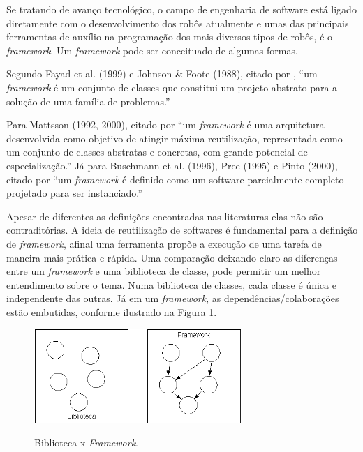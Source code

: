 Se tratando de avanço tecnológico, o campo de engenharia de software está ligado diretamente com o desenvolvimento dos robôs atualmente e umas das principais ferramentas de auxílio na programação dos mais diversos tipos de robôs, é o \textit{framework}. Um \textit{framework} pode ser conceituado de algumas formas.

Segundo Fayad et al. (1999) e Johnson \& Foote (1988), citado por , “um \textit{framework }é um conjunto de classes que constitui um projeto abstrato para a solução de uma família de problemas.”

Para Mattsson (1992, 2000), citado por  “um \textit{framework} é uma arquitetura desenvolvida como objetivo de atingir máxima reutilização, representada como um conjunto de classes abstratas e concretas, com grande potencial de especialização.”
Já para Buschmann et al. (1996), Pree (1995) e Pinto (2000), citado por  “um \textit{framework }é definido como um software parcialmente completo projetado para ser instanciado.”

Apesar de diferentes as definições encontradas nas literaturas elas não são contraditórias. A ideia de reutilização de softwares é fundamental para a definição de \textit{framework}, afinal uma ferramenta propõe a execução de uma tarefa de maneira mais prática e rápida. Uma comparação deixando claro as diferenças entre um \textit{framework }e uma biblioteca de classe, pode permitir um melhor entendimento sobre o tema. Numa biblioteca de classes, cada classe é única e independente das outras. Já em um \textit{framework}, as dependências/colaborações estão embutidas, conforme ilustrado na Figura \ref{fig:biblioteca_vs_framework}.

\begin{figure}[H]
	\centering
	\caption{Biblioteca x \textit{Framework}.}
	\includegraphics[width=0.7\textwidth]
	{Figures/biblioteca_vs_framework}
	\label{fig:biblioteca_vs_framework}
\end{figure}

